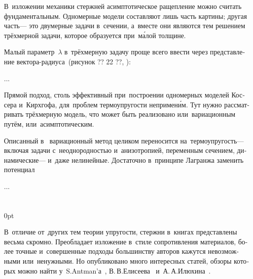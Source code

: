 \begin{otherlanguage}{russian}

В~изложении механики стержней асимптотическое ращепление можно считать фундаментальным. Одномерные модели составляют лишь часть картины; другая часть\:--- это двумерные задачи в~сечении, а~вместе они являются тем решением трёхмерной задачи, которое образуется при~м\'{а}лой толщине.

Малый параметр~$\lambda$ в~трёхмерную задачу проще всего ввести через представление вектора\hbox{-}радиуса~(рисунок ?? 22 ??, ):

...



\end{otherlanguage}



\begin{otherlanguage}{russian}

Прямой подход, столь эффективный при~построении одномерных моделей Коссера и~Кирхгофа, для~проблем термоупругости непримен\'{и}м. Тут нужно рассматривать трёхмерную модель, что может быть реализовано или~вариационным путём, или~асимптотическим.

Описанный в~ вариационный метод целиком переносится на~термоупругость\:--- включая задачи с~неоднородностью и~анизотропией, переменным сечением, динамические\:--- и~даже нелинейные. Достаточно в~принципе Лагранжа заменить потенциал

...




\end{otherlanguage}

\section*{\small \wordforbibliography}

\begin{changemargin}{\parindent}{0pt}
\fontsize{10}{12}\selectfont

\begin{otherlanguage}{russian}

В~отличие от~других тем теории упругости, стержни в~книгах представлены весьма скромно. Преобладает изложение в~стиле сопротивления материалов, более точные и~совершенные подходы большинству авторов кажутся невозможными или~ненужными. Но опубликовано много интересных статей, обзоры которых можно найти у~S.\:Antman’а~\cite{stuartantman-theoryofrods}, В.\,В.\;Елисеева~\cite{eliseev-models} и~А.\,А.\;Илюхина~\cite{ilyuhin-elasticrods}.

\end{otherlanguage}

\end{changemargin}
